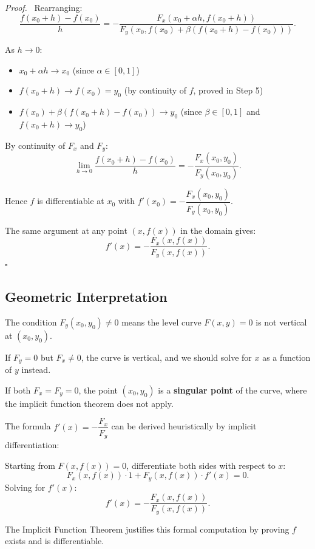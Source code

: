\documentclass[11pt]{report}
\renewenvironment{proof}[1][Proof]{\par\noindent\textit{#1.}\ }{\hfill$\square$\par\medskip}
\begin{document}
\begin{proof}
Rearranging:
\[
\frac{f(x_0 + h) - f(x_0)}{h} = -\frac{F_x(x_0 + \alpha h, f(x_0 + h))}{F_y(x_0, f(x_0) + \beta(f(x_0 + h) - f(x_0)))}.
\]

As $h \to 0$:
\begin{itemize}[itemsep=2pt]
    \item $x_0 + \alpha h \to x_0$ (since $\alpha \in [0, 1]$)
    \item $f(x_0 + h) \to f(x_0) = y_0$ (by continuity of $f$, proved in Step 5)
    \item $f(x_0) + \beta(f(x_0 + h) - f(x_0)) \to y_0$ (since $\beta \in [0, 1]$ and $f(x_0 + h) \to y_0$)
\end{itemize}

By continuity of $F_x$ and $F_y$:
\[
\lim_{h \to 0} \frac{f(x_0 + h) - f(x_0)}{h} = -\frac{F_x(x_0, y_0)}{F_y(x_0, y_0)}.
\]

Hence $f$ is differentiable at $x_0$ with $f'(x_0) = -\dfrac{F_x(x_0, y_0)}{F_y(x_0, y_0)}$.

The same argument at any point $(x, f(x))$ in the domain gives:
\[
f'(x) = -\frac{F_x(x, f(x))}{F_y(x, f(x))}.
\]
\end{proof}

\subsection{Geometric Interpretation}

\begin{remark}
The condition $F_y(x_0, y_0) \neq 0$ means the level curve $F(x, y) = 0$ is not vertical at $(x_0, y_0)$.

If $F_y = 0$ but $F_x \neq 0$, the curve is vertical, and we should solve for $x$ as a function of $y$ instead.

If both $F_x = F_y = 0$, the point $(x_0, y_0)$ is a \textbf{singular point} of the curve, where the implicit function theorem does not apply.
\end{remark}

\begin{remark}
The formula $f'(x) = -\dfrac{F_x}{F_y}$ can be derived heuristically by implicit differentiation:

Starting from $F(x, f(x)) = 0$, differentiate both sides with respect to $x$:
\[
F_x(x, f(x)) \cdot 1 + F_y(x, f(x)) \cdot f'(x) = 0.
\]
Solving for $f'(x)$:
\[
f'(x) = -\frac{F_x(x, f(x))}{F_y(x, f(x))}.
\]

The Implicit Function Theorem justifies this formal computation by proving $f$ exists and is differentiable.
\end{remark}
\end{document}
